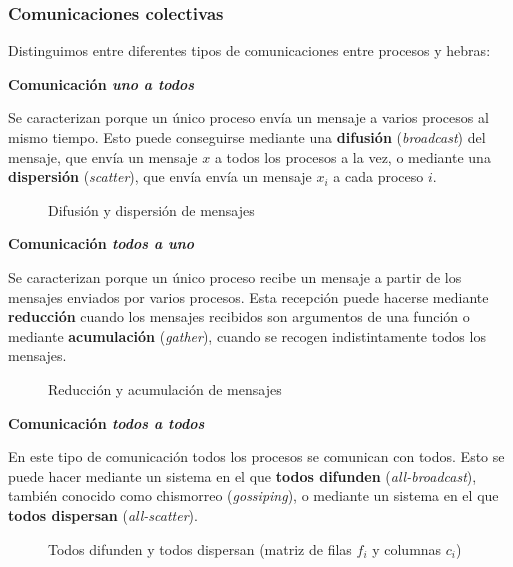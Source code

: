 \subsubsection{Comunicaciones colectivas}

Distinguimos entre diferentes tipos de comunicaciones entre procesos y hebras:

\textbf{Comunicación \textit{uno a todos}}

Se caracterizan porque un único proceso envía un mensaje a varios procesos al mismo tiempo.
Esto puede conseguirse mediante una \textbf{difusión} (\textit{broadcast}) del mensaje, que envía un mensaje $x$ a todos los procesos a la vez, o mediante una \textbf{dispersión} (\textit{scatter}), que envía envía un mensaje $x_i$ a cada proceso $i$.

\begin{figure}[h]
\begin{center}


\end{center}
\caption{Difusión y dispersión de mensajes}
\end{figure}

\textbf{Comunicación \textit{todos a uno}}

Se caracterizan porque un único proceso recibe un mensaje a partir de los mensajes enviados por varios procesos.
Esta recepción puede hacerse mediante \textbf{reducción} cuando los mensajes recibidos son argumentos de una función o mediante \textbf{acumulación} (\textit{gather}), cuando se recogen indistintamente todos los mensajes.

\begin{figure}[h]
\begin{center}


\end{center}
\caption{Reducción y acumulación de mensajes}
\end{figure}

\textbf{Comunicación \textit{todos a todos}}

En este tipo de comunicación todos los procesos se comunican con todos.
Esto se puede hacer mediante un sistema en el que \textbf{todos difunden} (\textit{all-broadcast}), también conocido como chismorreo (\textit{gossiping}), o mediante un sistema en el que \textbf{todos dispersan} (\textit{all-scatter}).

\begin{figure}[h]
\begin{center}


\end{center}
\caption{Todos difunden y todos dispersan (matriz de filas $f_i$ y columnas $c_i$)}
\end{figure}

